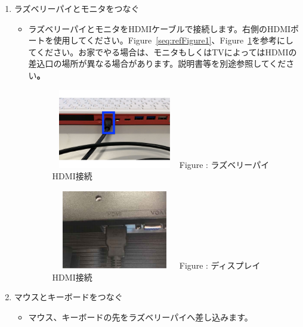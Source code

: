 \documentclass[a4paper,12pt]{jarticle}
\begin{document}
\begin{enumerate}
  \item ラズベリーパイとモニタをつなぐ

        \begin{itemize}
          \item
                ラズベリーパイとモニタをHDMIケーブルで接続します。右側のHDMIポートを使用してください。Figure~\ref{seq:refFigure1}、Figure~\ref{seq:refFigure2}を参考にしてください。お家でやる場合は、モニタもしくはTVによってはHDMIの差込口の場所が異なる場合があります。説明書等を別途参照してください\textbf{。}


                \begin{figure}[h]
                  \begin{minipage}{0.5\textwidth}
                    {\upshape
                      \includegraphics[width=5.519cm,height=3.471cm]{figure222023.pdf}
                      \newline
                      Figure {\theFigure\label{seq:refFigure1}}:
                      ラズベリーパイHDMI接続}
                  \end{minipage}
                  \begin{minipage}{0.5\textwidth}
                    {\upshape
                      \includegraphics[width=5.519cm,height=3.471cm]{textbook-img016.png}
                      \newline
                      Figure {\theFigure\label{seq:refFigure2}}:
                      ディスプレイHDMI接続}
                  \end{minipage}
                \end{figure}

        \end{itemize}
  \item マウスとキーボードをつなぐ

        \begin{itemize}
          \item
                マウス、キーボードの先をラズベリーパイへ差し込みます。
        \end{itemize}
\end{enumerate}
\end{document}

